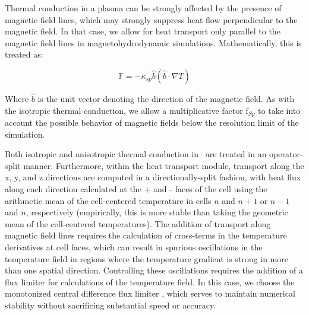 Thermal conduction in a
plasma can be strongly affected by the presence of magnetic field
lines, which may strongly suppress heat flow perpendicular to the
magnetic field.  In that case, we allow for heat transport only
parallel to
the magnetic field lines in magnetohydrodynamic simulations.
Mathematically, this is treated as:

\begin{equation}
\mathbb{F} = -\kappa_{sp} \hat{b} (\hat{b} \cdot \nabla T)
\end{equation}

Where $\hat{b}$ is the unit vector denoting the direction of the
magnetic field.  As with the isotropic thermal conduction, we allow a
multiplicative factor f$_{Sp}$ to take into account the possible
behavior of magnetic fields below the resolution limit of the
simulation.

Both isotropic and anisotropic thermal conduction in \enzo\ are treated
in an operator-split manner.  Furthermore, within the heat transport
module, transport along the x, y, and z directions are computed in a
directionally-split fashion, with heat flux along each direction
calculated at the + and - faces of the cell using the arithmetic mean
of the cell-centered temperature in cells $n$ and $n+1$ or $n-1$ and
$n$, respectively (empirically, this is more stable than taking the
geometric mean of the cell-centered temperatures).  The addition of
transport along magnetic field lines requires the calculation of
cross-terms in the temperature derivatives at cell faces, which can
result in spurious oscillations in the temperature field in regions
where the temperature gradient is strong in more than one spatial
direction.  Controlling these oscillations requires the addition of a
flux limiter for calculations of the temperature field.  In this case,
we choose the monotonized central difference flux limiter
\citep{1977JCoPh..23..263V}, which serves to maintain numerical
stability without sacrificing substantial speed or accuracy.
